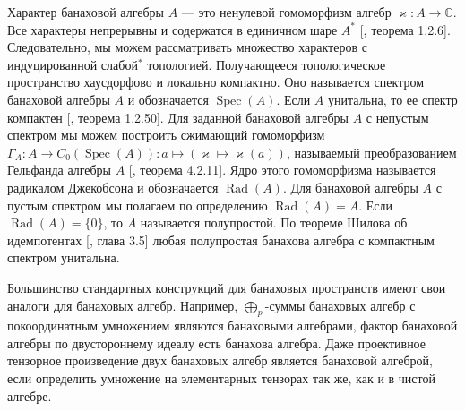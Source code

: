 Характер банаховой алгебры $A$ --- это ненулевой гомоморфизм алгебр $\varkappa:A\to\mathbb{C}$. Все характеры непрерывны и содержатся в единичном шаре $A^*$ [\cite{HelBanLocConvAlg}, теорема 1.2.6]. Следовательно, мы можем рассматривать множество характеров с индуцированной слабой$^*$ топологией. Получающееся топологическое пространство хаусдорфово и локально компактно. Оно называется спектром банаховой алгебры $A$ и обозначается $\operatorname{Spec}(A)$. Если $A$ унитальна, то ее спектр компактен [\cite{HelBanLocConvAlg}, теорема 1.2.50]. Для заданной банаховой алгебры $A$ с непустым спектром мы можем построить сжимающий гомоморфизм $\Gamma_A:A\to C_0(\operatorname{Spec}(A)):a\mapsto(\varkappa\mapsto \varkappa(a))$, называемый преобразованием Гельфанда алгебры $A$ [\cite{HelBanLocConvAlg}, теорема 4.2.11]. Ядро этого гомоморфизма называется радикалом Джекобсона и обозначается $\operatorname{Rad}(A)$. Для банаховой алгебры $A$ с пустым спектром мы полагаем по определению $\operatorname{Rad}(A)=A$. Если $\operatorname{Rad}(A)=\{0\}$, то $A$ называется полупростой. По теореме Шилова об идемпотентах [\cite{KaniBanAlg}, глава 3.5] любая полупростая банахова алгебра с компактным спектром унитальна.

Большинство стандартных конструкций для банаховых пространств имеют свои аналоги для банаховых алгебр.
Например, $\bigoplus_p$-суммы банаховых алгебр с покоординатным умножением являются банаховыми алгебрами, фактор банаховой алгебры по двустороннему идеалу есть банахова алгебра. Даже проективное тензорное произведение двух банаховых алгебр является банаховой алгеброй, если определить умножение на элементарных тензорах так же, как и в чистой алгебре.

